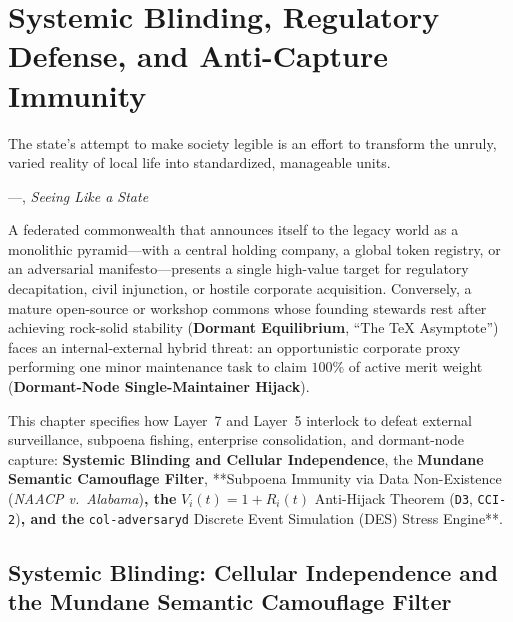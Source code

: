 \chapter{Systemic Blinding, Regulatory Defense, and Anti-Capture Immunity}
\label{ch:l7-regulatory-anti-capture}

\epigraph{The state's attempt to make society legible is an effort to transform the unruly, varied reality of local life into standardized, manageable units.}{---\textcite{scott1998}, \textit{Seeing Like a State}}

A federated commonwealth that announces itself to the legacy world as a monolithic pyramid---with a central holding company, a global token registry, or an adversarial manifesto---presents a single high-value target for regulatory decapitation, civil injunction, or hostile corporate acquisition. Conversely, a mature open-source or workshop commons whose founding stewards rest after achieving rock-solid stability (\textbf{Dormant Equilibrium}, ``The \TeX{} Asymptote'') faces an internal-external hybrid threat: an opportunistic corporate proxy performing one minor maintenance task to claim $100\%$ of active merit weight (\textbf{Dormant-Node Single-Maintainer Hijack}).

This chapter specifies how Layer~7 and Layer~5 interlock to defeat external surveillance, subpoena fishing, enterprise consolidation, and dormant-node capture: \textbf{Systemic Blinding and Cellular Independence}, the \textbf{Mundane Semantic Camouflage Filter}, **Subpoena Immunity via Data Non-Existence (\textit{NAACP v.~Alabama})\textbf{, the }$V_i(t) = 1 + R_i(t)$ Anti-Hijack Theorem (\texttt{D3}, \texttt{CCI-2})\textbf{, and the }\texttt{col-adversaryd} Discrete Event Simulation (DES) Stress Engine**.

\section{Systemic Blinding: Cellular Independence and the Mundane Semantic Camouflage Filter}
\label{sec:l7-systemic-blinding}

